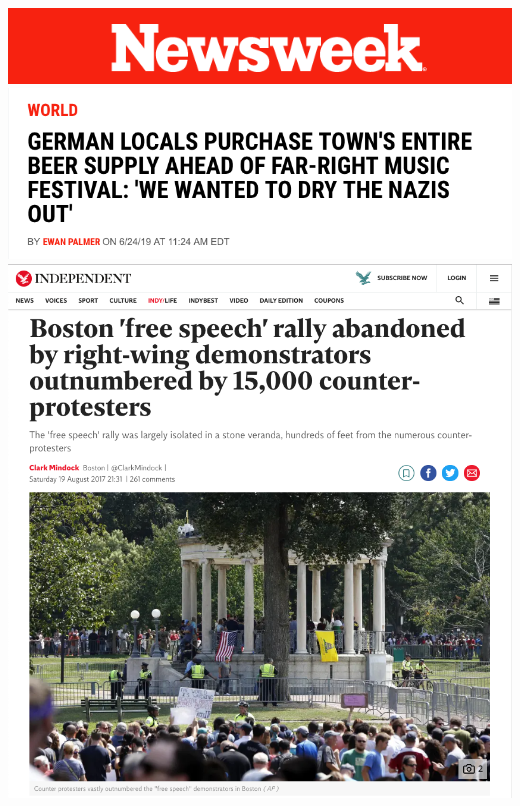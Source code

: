 \documentclass[nobackground,dvipsnames,table,aspectratio=169]{beamer}
\begin{document}
\begin{frame}{}
    \begin{columns}
            \centering
            \includegraphics[width=\textwidth]{newsweek}
            \includegraphics[width=\textwidth]{newsweek-article}
            \includegraphics[width=\textwidth]{rally-abandoned-counterprotests}
    \end{columns}
\end{frame}
\end{document}
